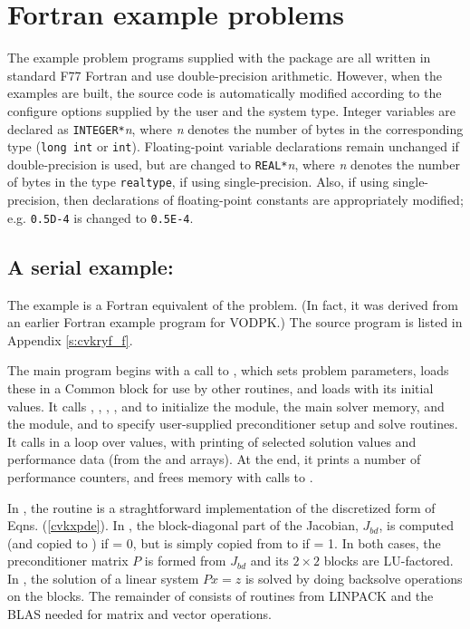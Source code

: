 \section{Fortran example problems}\label{s:ex_fortran}

The {\F} example problem programs supplied with the {\cvode}
package are all written in standard F77 Fortran and use double-precision
arithmetic. However, when the {\F} examples are built, the source code is
automatically modified according to the configure options supplied by the
user and the system type. Integer variables are declared as {\tt INTEGER*}{\em n},
where {\em n} denotes the number of bytes in the corresponding {\C} type
({\tt long int} or {\tt int}). Floating-point variable declarations remain
unchanged if double-precision is used, but are changed to {\tt REAL*}{\em n},
where {\em n} denotes the number of bytes in the {\sundials} type {\tt realtype},
if using single-precision. Also, if using single-precision, then declarations of
floating-point constants are appropriately modified; e.g. {\tt 0.5D-4} is
changed to {\tt 0.5E-4}.


\subsection{A serial example: }\label{ss:cvkryf}

The  example is a Fortran equivalent of the  problem.
(In fact, it was derived from an earlier Fortran example program for VODPK.)
The source program  is listed in Appendix \ref{s:cvkryf_f}.

The main program begins with a call to , which sets problem
parameters, loads these in a Common block for use by other routines, and
loads  with its initial values.  It calls , ,
, , and  to initialize
the {\nvecs} module, the main solver memory, and the {\cvspgmr} module, and
to specify user-supplied preconditioner setup and solve routines.
It calls  in a loop over  values, with printing of
selected solution values and performance data (from the   and 
arrays).  At the end, it prints a number of performance counters, and
frees memory with calls to .

In , the  routine is a straghtforward implementation
of the discretized form of Eqns. (\ref{cvkxpde}).  In , the
block-diagonal part of the Jacobian, $J_{bd}$, is computed (and copied to
) if  = 0, but is simply copied from  to  if
 = 1.  In both cases, the preconditioner matrix $P$ is formed from 
$J_{bd}$ and its $2 \times 2$ blocks are LU-factored.  In ,
the solution of a linear system $Px = z$ is solved by doing backsolve
operations on the blocks.  The remainder of  consists of
routines from LINPACK and the BLAS needed for matrix and vector operations.

